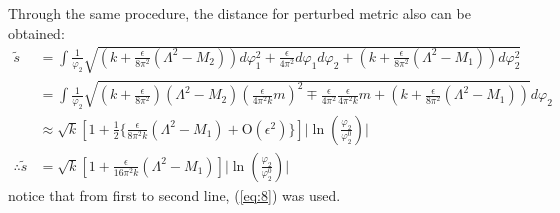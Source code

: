 \documentclass[fleqn]{article}
\begin{document}
Through the same procedure, the distance for perturbed metric also can be obtained:
\begin{align}
\tilde s &= \int \frac{1}{\varphi_{2}} \sqrt{(k+ \frac{\epsilon}{8\pi^{2}}(\Lambda ^{2} -M_{2}))d\varphi_{1}^{2} + \frac{\epsilon}{4\pi^{2}}d\varphi_{1}d\varphi_{2} + (k + \frac{\epsilon}{8\pi^{2}}(\Lambda ^{2} - M_{1}) )d\varphi_{2} ^{2}} \nonumber \\
&= \int \frac{1}{\varphi_{2}} \sqrt{(k+\frac{\epsilon}{8\pi^{2}})(\Lambda^{2} -M_{2}) (\frac{\epsilon}{4\pi^{2}k}m)^{2} \mp \frac{\epsilon}{4\pi^{2}} \frac{\epsilon}{4\pi^{2}k}m + (k + \frac{\epsilon}{8\pi^{2}}(\Lambda ^{2} - M_{1}))}d\varphi_{2} \nonumber \\
&\approx \sqrt{k}[1 + \frac{1}{2} \lbrace \frac{\epsilon}{8\pi^{2}k} (\Lambda^{2} -M_{1}) + \text{O}(\epsilon^{2})\rbrace] \lvert \ln(\frac{\varphi_{2}}{\varphi_{2}^{0}}) \rvert \nonumber \\
\therefore  \tilde s &= \sqrt{k} [1 + \frac{\epsilon}{16\pi^{2} k} (\Lambda ^{2} -M_{1})] \lvert \ln (\frac{\varphi_{2}} {\varphi_{2} ^{0}}) \rvert  
\end{align}
notice that from first to second line, (\ref{eq:8}) was used.
\end{document}
